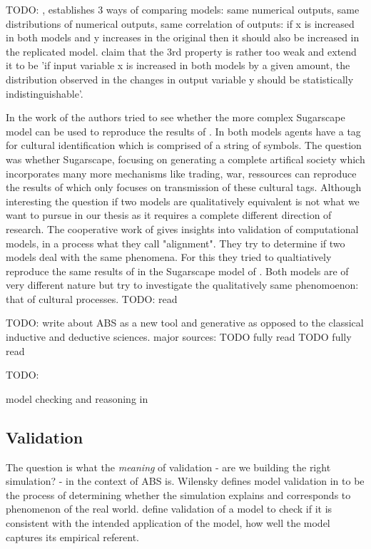 TODO: \cite{axelrod_advancing_1997}, establishes 3 ways of comparing models: same numerical outputs, same distributions of numerical outputs, same correlation of outputs: if x is increased in both models and y increases in the original then it should also be increased in the replicated model. \cite{ormerod_epistemological_2009} claim that the 3rd property is rather too weak and extend it to be 'if input variable x is increased in both models by a given amount, the distribution observed in the changes in output variable y should be statistically indistinguishable'.

In the work of \cite{axtell_aligning_1996} the authors tried to see whether the more complex Sugarscape model can be used to reproduce the results of \cite{axelrod_convergence_1995}. In both models agents have a tag for cultural identification which is comprised of a string of symbols. The question was whether Sugarscape, focusing on generating a complete artifical society which incorporates many more mechanisms like trading, war, ressources can reproduce the results of \cite{axelrod_convergence_1995} which only focuses on transmission of these cultural tags. Although interesting the question if two models are qualitatively equivalent is not what we want to pursue in our thesis as it requires a complete different direction of research.
The cooperative work of \cite{axtell_aligning_1996} gives insights into validation of computational models, in a process what they call "alignment". They try to determine if two models deal with the same phenomena. For this they tried to qualtiatively reproduce the same results of \cite{axelrod_convergence_1995} in the Sugarscape model of \cite{epstein_growing_1996}. Both models are of very different nature but try to investigate the qualitatively same phenomoenon: that of cultural processes. TODO: read

TODO: write about ABS as a new tool and  generative as opposed to the classical inductive and deductive sciences. major sources: 
TODO fully read \cite{epstein_chapter_2006}
TODO fully read \cite{epstein_generative_2012}

TODO: \cite{galan_errors_2009}


model checking and reasoning in \cite{hutton_tutorial_1999}\\

\subsection{Validation}
The question is what the \textit{meaning} of validation - are we building the right simulation? - in the context of ABS is. Wilensky defines model validation in \cite{wilensky_making_2007} to be the process of determining whether the simulation explains and corresponds to phenomenon of the real world.
\cite{galan_errors_2009} define validation of a model to check if it is consistent with the intended application of the model, how well the model captures its empirical referent.

